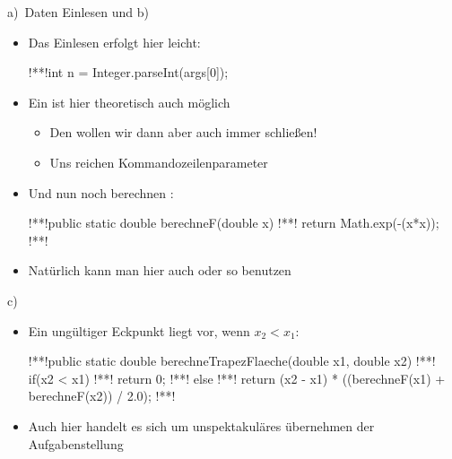 \begin{frame}[fragile]{a)~Daten Einlesen und b)~}
    \begin{itemize}[<+(1)->]
        \item Das Einlesen erfolgt hier leicht:
\begin{plainjava}[aboveskip=0pt]
!**!int n = Integer.parseInt(args[0]);
\end{plainjava}
        \item<4-> Ein  ist hier theoretisch auch möglich \begin{itemize}
            \item<5-> Den wollen wir dann aber auch immer schließen!
            \item<6-> Uns reichen Kommandozeilenparameter
        \end{itemize}
        \item<7-> Und nun noch berechnen :
\begin{plainjava}
!**!public static double berechneF(double x) {
!**!    return Math.exp(-(x*x));
!**!}
\end{plainjava}
        \item<10-> Natürlich kann man hier auch  oder so benutzen
    \end{itemize}
\end{frame}

\begin{frame}[fragile]{c)~}
    \begin{itemize}[<+(1)->]
        \item Ein ungültiger Eckpunkt liegt vor, wenn \(x_2 < x_1\):
\begin{plainjava}
!**!public static double berechneTrapezFlaeche(double x1, double x2) {
!**!    if(x2 < x1)
!**!        return 0;
!**!    else
!**!        return (x2 - x1) * ((berechneF(x1) + berechneF(x2)) / 2.0);
!**!}
\end{plainjava}
        \item<7-> Auch hier handelt es sich um unspektakuläres übernehmen der Aufgabenstellung
    \end{itemize}
\end{frame}

